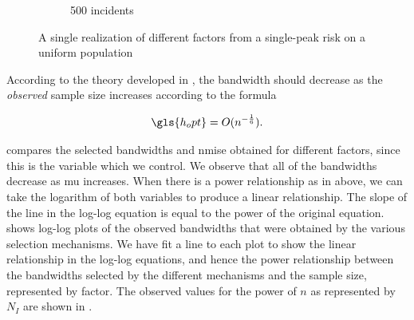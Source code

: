 \begin{figure}[htbp]
\begin{subfigure}{0.45\textwidth}
        \caption{500 incidents}
    \end{subfigure}
        \caption{A single realization of different \glspl{factor} from a single-peak risk on a uniform population}
        \label{fig:one_sample:unif_NCases_1h}
\end{figure}

According to the theory developed in ,
the bandwidth should decrease as the \textit{observed} sample size increases according to the formula

\begin{equation}
    \label{eq:h_opt}
    \gls{h_opt} = O(n^{-\frac{1}{6}}) \text{.}
\end{equation}

 compares the selected bandwidths and \gls{nmise} obtained for different \glspl{factor},
since this is the variable which we control.
We observe that all of the bandwidths decrease as \gls{mu} increases.
When there is a power relationship as in  above, we can take the logarithm of both variables to produce a linear relationship.
The slope of the line in the log-log equation is equal to the power of the original equation.
 shows log-log plots of the observed bandwidths that were obtained by the various selection mechanisms.
We have fit a line to each plot to show the linear relationship in the log-log equations, and hence the power relationship between the bandwidths selected by the different mechanisms and the sample size, represented by \gls{factor}.
The observed values for the power of $n$ as represented by $N_I$ are shown in .





